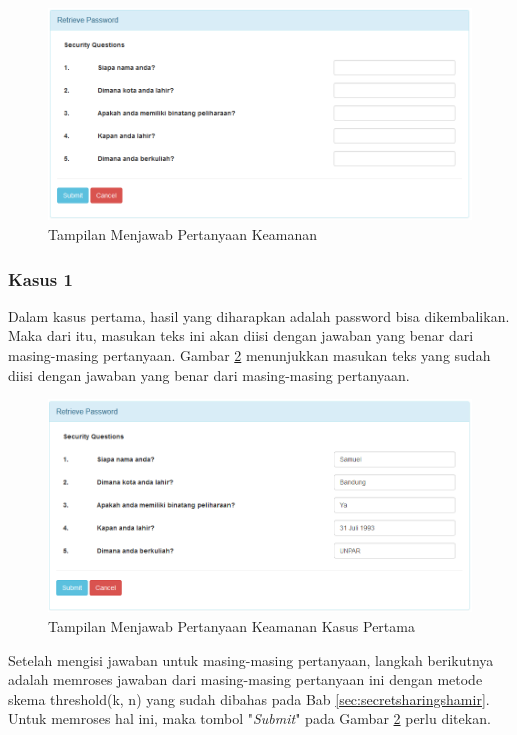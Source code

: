 \begin{figure}[H]
	\includegraphics[scale=0.6]{Gambar/fungsional1}
	\centering
	\caption{Tampilan Menjawab Pertanyaan Keamanan}\label{fig:fungsional1}
\end{figure}

\subsubsection{Kasus 1}

Dalam kasus pertama, hasil yang diharapkan adalah password bisa dikembalikan. Maka dari itu, masukan teks ini akan diisi dengan jawaban yang benar dari masing-masing pertanyaan. Gambar \ref{fig:fungsional2} menunjukkan masukan teks yang sudah diisi dengan jawaban yang benar dari masing-masing pertanyaan.

\begin{figure}[H]
	\includegraphics[scale=0.6]{Gambar/fungsional2}
	\centering
	\caption{Tampilan Menjawab Pertanyaan Keamanan Kasus Pertama}\label{fig:fungsional2}
\end{figure}

Setelah mengisi jawaban untuk masing-masing pertanyaan, langkah berikutnya adalah memroses jawaban dari masing-masing pertanyaan ini dengan metode skema threshold(k, n) yang sudah dibahas pada Bab \ref{sec:secretsharingshamir}. Untuk memroses hal ini, maka tombol "\textit{Submit}" pada Gambar \ref{fig:fungsional2} perlu ditekan.

